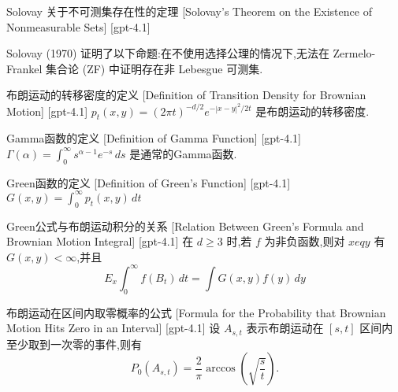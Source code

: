 \documentclass[UTF8]{ctexart}
\begin{document}
    
    
    \begin{thm}
        {Solovay 关于不可测集存在性的定理}
        [Solovay's Theorem on the Existence of Nonmeasurable Sets]
        [gpt-4.1]
        
Solovay (1970) 证明了以下命题:在不使用选择公理的情况下,无法在 Zermelo-Frankel 集合论 (ZF) 中证明存在非 Lebesgue 可测集.

    \end{thm}
    
    
    
    \begin{dfn}
        {布朗运动的转移密度的定义}
        [Definition of Transition Density for Brownian Motion]
        [gpt-4.1]
        $p_t(x, y) = (2\pi t)^{-d/2} e^{-|x-y|^2/2t}$ 是布朗运动的转移密度.
    \end{dfn}
    
    
    
    \begin{dfn}
        {Gamma函数的定义}
        [Definition of Gamma Function]
        [gpt-4.1]
        $\Gamma(\alpha) = \int_{0}^{\infty} s^{\alpha-1} e^{-s}\,ds$ 是通常的Gamma函数.
    \end{dfn}
    
    
    
    \begin{dfn}
        {Green函数的定义}
        [Definition of Green's Function]
        [gpt-4.1]
        $G(x, y) = \int_{0}^{\infty} p_t(x, y)\,dt$
    \end{dfn}
    
    
    
    \begin{thm}
        {Green公式与布朗运动积分的关系}
        [Relation Between Green's Formula and Brownian Motion Integral]
        [gpt-4.1]
        在 $d \geq 3$ 时,若 $f$ 为非负函数,则对 $x 
eq y$ 有 $G(x, y) < \infty$,并且
\[
E_x \int_{0}^{\infty} f(B_t)\,dt = \int G(x, y) f(y)\,dy
\]
    \end{thm}
    
    
    
    \begin{thm}
        {布朗运动在区间内取零概率的公式}
        [Formula for the Probability that Brownian Motion Hits Zero in an Interval]
        [gpt-4.1]
        设 $A_{s, t}$ 表示布朗运动在 $[s, t]$ 区间内至少取到一次零的事件,则有
\[
P_{0}( A_{s, t} ) = \frac{2}{\pi} \arccos \left( \sqrt{\frac{s}{t}} \right).
\]

    \end{thm}
    
\end{document}
